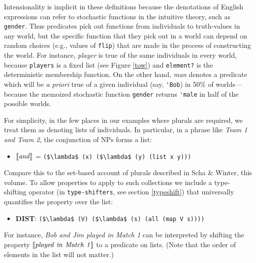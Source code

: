 \documentclass[pdfextras]{handbook}
\newcommand{\llbracket}{\ensuremath{\left [\!\left [}}%
\newcommand{\rrbracket}{\ensuremath{\right ]\!\right ]}}
\providecommand{\sv}[1]{\ensuremath{\llbracket \mathit{#1} \rrbracket}}
\begin{document}
Intensionality is implicit in these definitions because the denotations of English expressions can refer to stochastic functions in the intuitive theory, such as \lstinline{gender}.
Thus predicates pick out functions from individuals to truth-values in any world, but the specific function that they pick out in a world can depend on random choices (e.g., values of \lstinline{flip}) that are made in the process of constructing the world. 
For instance, \emph{player} is true of the same individuals in every world, because \lstinline{players} is a fixed list (see Figure \ref{tow}) and \lstinline{element?} is the deterministic membership function. 
On the other hand, \emph{man} denotes a predicate which will be \emph{a priori} true of a given individual (say, \lstinline{'Bob}) in 50\% of worlds---because the memoized stochastic function \lstinline{gender} returns \lstinline{'male} in half of the possible worlds.

For simplicity, in the few places in our examples where plurals are required, we treat them as denoting lists of individuals. In particular, in a phrase like \emph{Team 1 and Team 2}, the conjunction of NPs forms a list: 
\begin{itemize}
\item \sv{and} = \lstinline[mathescape]{($\lambda$ (x) ($\lambda$ (y) (list x y)))}   
\end{itemize}
Compare this to the set-based account of plurals described in Scha \& Winter, this volume. To allow properties to apply to such collections we include a type-shifting operator (in \lstinline{type-shifters}, see section \ref{typeshift}) that universally quantifies the property over the list:
\begin{itemize}
\item \textbf{DIST}: \lstinline[mathescape]{($\lambda$ (V) ($\lambda$ (s) (all (map V s))))}
\end{itemize}
For instance, \emph{Bob and Jim played in Match 1} can be interpreted by shifting the property \sv{played\ in\ Match\ 1} to a predicate on lists. (Note that the order of elements in the list will not matter.)
\end{document}
